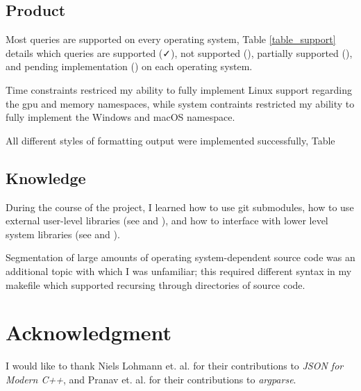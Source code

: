 \documentclass[conference]{IEEEtran}
\begin{document}
\subsection{Product}
Most queries are supported on every operating system, Table \ref{table_support} details which queries are
supported (\faCheck), not supported (\faTimes), partially supported (\faPlus), and pending implementation (\faMinus)
on each operating system.

Time constraints restriced my ability to fully implement Linux support regarding the gpu and memory namespaces,
while system contraints restricted my ability to fully implement the Windows and macOS namespace.

All different styles of formatting output were implemented successfully, Table

\subsection{Knowledge}
During the course of the project, I learned how to use git submodules, how to use external user-level libraries (see \cite{lohmann:json} and \cite{pranav:argparse}),
and how to interface with lower level system libraries (see \cite{whims:wmi} and \cite{dicanio:winreg}).

Segmentation of large amounts of operating system-dependent source code was an additional topic with which I was unfamiliar;
this required different syntax in my makefile which supported recursing through directories of source code.

\section*{Acknowledgment}

I would like to thank Niels Lohmann et. al. for their contributions to \textit{JSON for Modern C++},
and Pranav et. al. for their contributions to \textit{argparse}.

\newpage
\end{document}
